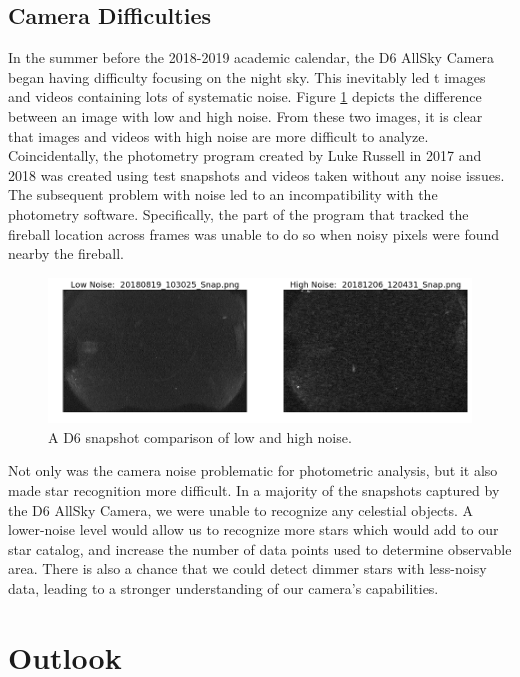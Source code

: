 \subsection{Camera Difficulties}

In the summer before the 2018-2019 academic calendar, the D6 AllSky Camera began having difficulty focusing on the night sky.
This inevitably led t images and videos containing lots of systematic noise.  
Figure \ref{camera_noise} depicts the difference between an image with low and high noise.
From these two images, it is clear that images and videos with high noise are more difficult to analyze.
Coincidentally, the photometry program created by Luke Russell in 2017 and 2018 was created using test snapshots and videos taken without any noise issues.
The subsequent problem with noise led to an incompatibility with the photometry software.
Specifically, the part of the program that tracked the fireball location across frames was unable to do so when noisy pixels were found nearby the fireball.

\begin{figure}[ht!]
  \centering
  \includegraphics[scale=0.5]{images/low_and_high_noise.png}
  \caption{A D6 snapshot comparison of low and high noise.}
  \label{camera_noise}
\end{figure}

Not only was the camera noise problematic for photometric analysis, but it also made star recognition more difficult.
In a majority of the snapshots captured by the D6 AllSky Camera, we were unable to recognize any celestial objects.
A lower-noise level would allow us to recognize more stars which would add to our star catalog, and increase the number of data points used to determine observable area.
There is also a chance that we could detect dimmer stars with less-noisy data, leading to a stronger understanding of our camera's capabilities.

\section{Outlook}

